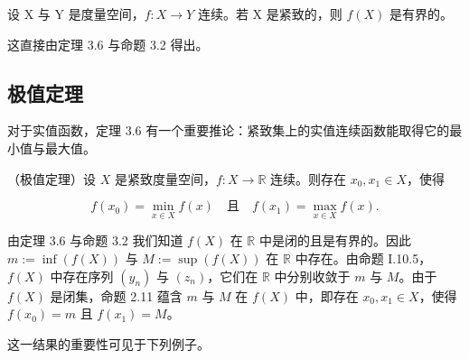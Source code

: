\begin{corollary}

设 X 与 Y 是度量空间，$ f: X \to Y $ 连续。若 X 是紧致的，则 $ f(X) $ 是有界的。

\proofhead
这直接由定理 3.6 与命题 3.2 得出。
\end{corollary}

\subsection*{极值定理}

对于实值函数，定理 3.6 有一个重要推论：紧致集上的实值连续函数能取得它的最小值与最大值。

\begin{corollary}

（极值定理）设 $X$ 是紧致度量空间，$f: X \to \mathbb{R}$ 连续。则存在 $x_0, x_1 \in X$，使得

\[
f(x_{0})=\min_{x\in X}f(x)\quad\text{且}\quad f(x_{1})=\max_{x\in X}f(x).
\]

\proofhead
由定理 3.6 与命题 3.2 我们知道 $f(X)$ 在 $\mathbb{R}$ 中是闭的且是有界的。因此 $m := \inf\left(f(X)\right)$ 与 $M := \sup\left(f(X)\right)$ 在 $\mathbb{R}$ 中存在。由命题 I.10.5，$f(X)$ 中存在序列 $(y_n)$ 与 $(z_n)$，它们在 $\mathbb{R}$ 中分别收敛于 $m$ 与 $M$。由于 $f(X)$ 是闭集，命题 2.11 蕴含 $m$ 与 $M$ 在 $f(X)$ 中，即存在 $x_0, x_1 \in X$，使得 $f(x_0) = m$ 且 $f(x_1) = M$。

这一结果的重要性可见于下列例子。
\end{corollary}

